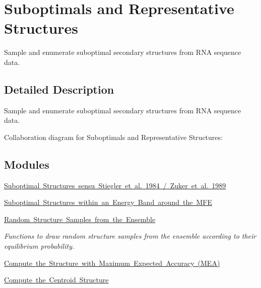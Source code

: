 \hypertarget{group__subopt__and__representatives}{}\section{Suboptimals and Representative Structures}
\label{group__subopt__and__representatives}


Sample and enumerate suboptimal secondary structures from R\+NA sequence data.  




\subsection{Detailed Description}
Sample and enumerate suboptimal secondary structures from R\+NA sequence data. 

Collaboration diagram for Suboptimals and Representative Structures\+:
\subsection*{Modules}
\begin{DoxyCompactItemize}
\item 
\mbox{\hyperlink{group__subopt__zuker}{Suboptimal Structures sensu Stiegler et al. 1984 / Zuker et al. 1989}}
\item 
\mbox{\hyperlink{group__subopt__wuchty}{Suboptimal Structures within an Energy Band around the M\+FE}}
\item 
\mbox{\hyperlink{group__subopt__stochbt}{Random Structure Samples from the Ensemble}}
\begin{DoxyCompactList}\small\item\em Functions to draw random structure samples from the ensemble according to their equilibrium probability. \end{DoxyCompactList}\item 
\mbox{\hyperlink{group__mea__fold}{Compute the Structure with Maximum Expected Accuracy (\+M\+E\+A)}}
\item 
\mbox{\hyperlink{group__centroid__fold}{Compute the Centroid Structure}}
\end{DoxyCompactItemize}
